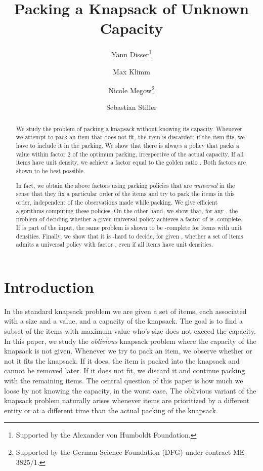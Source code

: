 \documentclass[11pt]{article}
\begin{document}
\title{Packing a Knapsack of Unknown Capacity}


\author{Yann Disser\thanks{Supported by the Alexander von Humboldt Foundation.}}
\author{Max Klimm}
\author{Nicole Megow\thanks{Supported by the German Science Foundation (DFG) under contract  ME 3825/1.}}
\author{Sebastian Stiller}

\maketitle
\begin{abstract}
We study the problem of packing a knapsack without knowing its capacity.
Whenever we attempt to pack an item that does not fit, the item is
discarded; if the item fits, we have to include it in the packing.
We show that there is always a policy that packs a value within factor
2 of the optimum packing, irrespective of the actual capacity. If
all items have unit density, we achieve a factor equal to the golden
ratio . Both factors are shown to be best possible.

In fact, we obtain the above factors using packing policies that are
\emph{universal} in the sense that they fix a particular order of
the items and try to pack the items in this order, independent of
the observations made while packing. We give efficient algorithms
computing these policies. On the other hand, we show that, for any
, the problem of deciding whether a given universal policy
achieves a factor of  is -complete. If 
is part of the input, the same problem is shown to be -complete
for items with unit densities. Finally, we show that it is -hard
to decide, for given , whether a set of items admits a universal
policy with factor , even if all items have unit densities.
\end{abstract}
\smallskip
\section{Introduction}

In the standard knapsack problem we are given a set of items, each
associated with a size and a value, and a capacity of the knapsack.
The goal is to find a subset of the items with maximum value who's
size does not exceed the capacity. In this paper, we study the \emph{oblivious
}knapsack problem where the capacity of the knapsack is not given.
Whenever we try to pack an item, we observe whether or not it fits
the knapsack. If it does, the item is packed into the knapsack and
cannot be removed later. If it does not fit, we discard it and continue
packing with the remaining items. The central question of this paper
is how much we loose by not knowing the capacity, in the worst case.
The oblivious variant of the knapsack problem naturally arises whenever
items are prioritized by a different entity or at a different time
than the actual packing of the knapsack.
\end{document}
